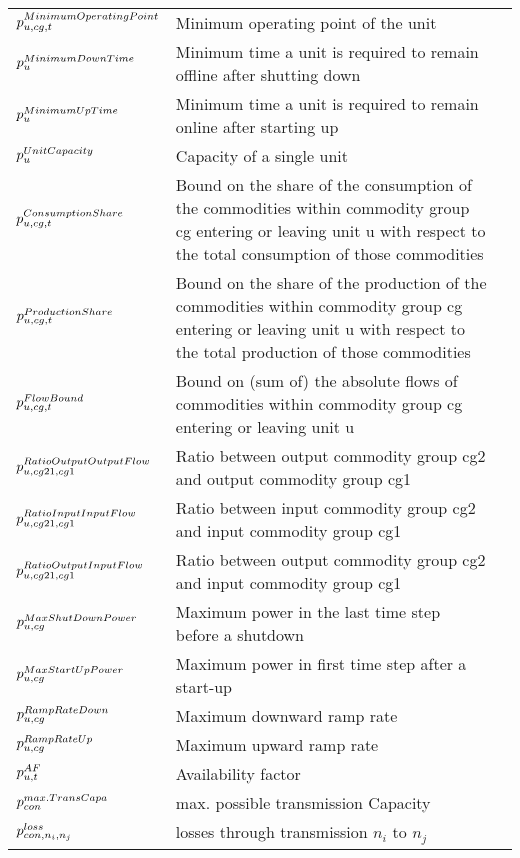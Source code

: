 \begin{longtable}{p{\cola} p{\colc} >{\small\raggedleft\arraybackslash\itshape}p{\colb}}
		$p^{MinimumOperatingPoint}_{u,cg,t}$	& Minimum operating point of the unit                         	&                \\
		$p^{MinimumDownTime}_{u}$	& Minimum time a unit is required to remain offline after shutting down	&                \\
		$p^{MinimumUpTime}_{u}$	& Minimum time a unit is required to remain online after starting up	&                \\
		$p^{UnitCapacity}_{u} $	& Capacity of a single unit                                   	&                \\
		$p^{ConsumptionShare}_{u,cg,t}$	& Bound on the share of the consumption of the commodities within commodity group cg entering or leaving unit u with respect to the total consumption of those commodities	&                \\
		$p^{ProductionShare}_{u,cg,t}$	& Bound on the share of the production of the commodities within commodity group cg entering or leaving unit u with respect to the total production of those commodities	&                \\
		$p^{FlowBound}_{u,cg,t}    $	& Bound on (sum of) the absolute flows of commodities within commodity group cg entering or leaving unit u 	&                \\
		$p^{RatioOutputOutputFlow}_{u,cg21,cg1}$	& Ratio between output commodity group cg2 and output commodity group cg1	&                \\
		$p^{RatioInputInputFlow}_{u,cg21,cg1}$	& Ratio between input commodity group cg2 and input commodity group cg1	&                \\
		$p^{RatioOutputInputFlow}_{u,cg21,cg1}$	& Ratio between output commodity group cg2 and input commodity group cg1	&                \\
		$p^{MaxShutDownPower}_{u,cg}$	& Maximum power in the last time step before a shutdown       	&                \\
		$p^{MaxStartUpPower}_{u,cg}$	& Maximum power in first time step after a start-up           	&                \\
		$p^{RampRateDown}_{u,cg} $	& Maximum downward ramp rate                                  	&                \\
		$p^{RampRateUp}_{u,cg}   $	& Maximum upward ramp rate                                    	&                \\
		$p^{AF}_{u,t}           $	& Availability factor                                         	&                \\[0.5em]

		$p^{max.TransCapa}_{{con}} $	& max. possible transmission Capacity                         	&                \\
		$p^{loss}_{{con},n_i,n_j}    $	& losses through transmission $n_i$ to $n_j$                  	&                \\
	\end{longtable}

